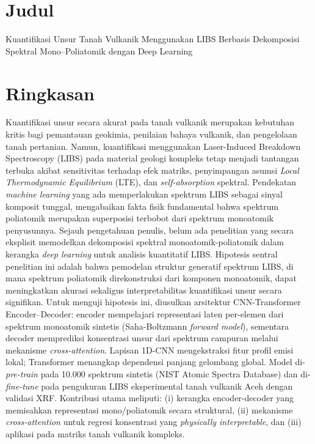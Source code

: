 \documentclass[12pt, a4paper]{article}
\begin{document}
\tableofcontents
\newpage

\section{Judul}
\begin{center}
    \Large Kuantifikasi Unsur Tanah Vulkanik Menggunakan LIBS Berbasis Dekomposisi Spektral Mono–Poliatomik dengan Deep Learning
\end{center}
\vspace{0.5cm}

\section{Ringkasan}
Kuantifikasi unsur secara akurat pada tanah vulkanik merupakan kebutuhan kritis bagi pemantauan geokimia, penilaian bahaya vulkanik, dan pengelolaan tanah pertanian. Namun, kuantifikasi menggunakan Laser-Induced Breakdown Spectroscopy (LIBS) pada material geologi kompleks tetap menjadi tantangan terbuka akibat sensitivitas terhadap efek matriks, penyimpangan asumsi \textit{Local Thermodynamic Equilibrium} (LTE), dan \textit{self-absorption} spektral. Pendekatan \textit{machine learning} yang ada memperlakukan spektrum LIBS sebagai sinyal komposit tunggal, mengabaikan fakta fisik fundamental bahwa spektrum poliatomik merupakan superposisi terbobot dari spektrum monoatomik penyusunnya. Sejauh pengetahuan penulis, belum ada penelitian yang secara eksplisit memodelkan dekomposisi spektral monoatomik-poliatomik dalam kerangka \textit{deep learning} untuk analisis kuantitatif LIBS. Hipotesis sentral penelitian ini adalah bahwa pemodelan struktur generatif spektrum LIBS, di mana spektrum poliatomik direkonstruksi dari komponen monoatomik, dapat meningkatkan akurasi sekaligus interpretabilitas kuantifikasi unsur secara signifikan. Untuk menguji hipotesis ini, diusulkan arsitektur CNN-Transformer Encoder--Decoder: encoder mempelajari representasi laten per-elemen dari spektrum monoatomik sintetis (Saha-Boltzmann \textit{forward model}), sementara decoder memprediksi konsentrasi unsur dari spektrum campuran melalui mekanisme \textit{cross-attention}. Lapisan 1D-CNN mengekstraksi fitur profil emisi lokal; Transformer menangkap dependensi panjang gelombang global. Model di-\textit{pre-train} pada 10.000 spektrum sintetis (NIST Atomic Spectra Database) dan di-\textit{fine-tune} pada pengukuran LIBS eksperimental tanah vulkanik Aceh dengan validasi XRF. Kontribusi utama meliputi: (i) kerangka encoder-decoder yang memisahkan representasi mono/poliatomik secara struktural, (ii) mekanisme \textit{cross-attention} untuk regresi konsentrasi yang \textit{physically interpretable}, dan (iii) aplikasi pada matriks tanah vulkanik kompleks.
\end{document}
